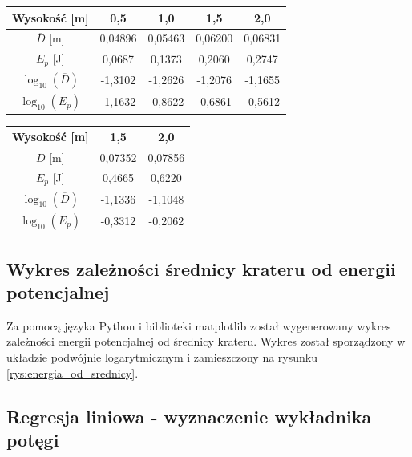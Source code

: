 \documentclass[a4paper,12pt]{article}
\begin{document}
\begin{center}
    \begin{tabular}{|c|c|c|c|c|}
        \hline
        Wysokość [m] & 0,5 & 1,0 & 1,5 & 2,0 \\
        \hline
        $\overline{D}$ [m] & 0,04896 & 0,05463 & 0,06200 & 0,06831 \\
        \hline
        $E_p$ [J] & 0,0687 & 0,1373 & 0,2060 & 0,2747 \\
        \hline
        $\log_{10}(\overline{D})$ & -1,3102 & -1,2626 & -1,2076 & -1,1655 \\
        \hline
        $\log_{10}(E_p)$ & -1,1632 & -0,8622 & -0,6861 & -0,5612 \\
        \hline
    \end{tabular}
    \label{tab:wyniki_srednia}
\end{center}

\begin{center}
    \begin{tabular}{|c|c|c|}
        \hline
        Wysokość [m] & 1,5 & 2,0 \\
        \hline
        $\overline{D}$ [m] & 0,07352 & 0,07856 \\
        \hline
        $E_p$ [J] & 0,4665 & 0,6220 \\
        \hline
        $\log_{10}(\overline{D})$ & -1,1336 & -1,1048 \\
        \hline
        $\log_{10}(E_p)$ & -0,3312 & -0,2062 \\
        \hline
    \end{tabular}
    \label{tab:wyniki_duza}
\end{center}

\subsection{Wykres zależności średnicy krateru od energii potencjalnej}

Za pomocą języka Python i biblioteki matplotlib został wygenerowany wykres zależności energii potencjalnej od średnicy krateru. Wykres został sporządzony w układzie podwójnie logarytmicznym i zamieszczony na rysunku \ref{rys:energia_od_srednicy}.

\subsection{Regresja liniowa - wyznaczenie wykładnika potęgi}
\end{document}
